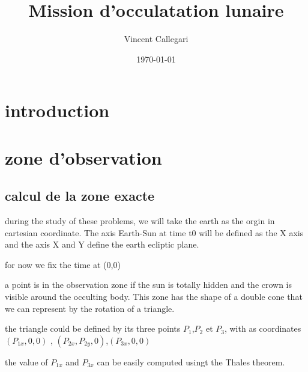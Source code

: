 \documentclass{article} %
\title{Mission d'occulatation lunaire} %
\author{Vincent Callegari} %
\date{\today} %
\begin{document}
		\maketitle
		\section{introduction}%
		\section{zone d'observation}
		\subsection{calcul de la zone exacte}
		
		during the study of these problems, we will take the earth as the orgin in cartesian coordinate. The axis Earth-Sun at time t0 will be defined as the X axis and the axis X and Y define the earth ecliptic plane. 
		
		for now we fix the time at (0,0)
		
		
		a point is in the observation zone if the sun is totally hidden and the crown is visible around the occulting body. This zone has the shape of a double cone that we can represent by the rotation of a triangle.
		
		
		the triangle could be defined by its three points
		$P_1$,$P_2$ et $P_3$, with as coordinates $(P_{1x},0,0)$ , $(P_{2x},P_{2y},0)$,$(P_{3x},0,0)$ 
		
		
		the value of $P_{1x}$ and $P_{3x}$ can be easily computed usingt the Thales theorem.
		
		
\end{document}

